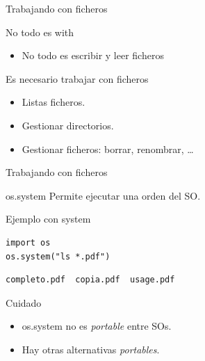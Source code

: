 \documentclass[bigger,unknownkeysallowed]{beamer}
\begin{document}
\begin{frame}[label={sec:org4c10693}]{Trabajando con ficheros}
\begin{block}{No todo es with}
\begin{itemize}
\item No todo es escribir y leer ficheros
\end{itemize}
\end{block}

\begin{block}{Es necesario trabajar con ficheros}
\begin{itemize}
\item Listas ficheros.

\item Gestionar directorios.

\item Gestionar ficheros: borrar, renombrar, \ldots{}
\end{itemize}
\end{block}
\end{frame}

\begin{frame}[fragile,label={sec:orga64b8b8}]{Trabajando con ficheros}
 \begin{block}{os.system}
Permite ejecutar una orden del SO.
\end{block}

\begin{exampleblock}{Ejemplo con system}
\begin{verbatim}
import os
os.system("ls *.pdf")
\end{verbatim}
\scriptsize
\begin{verbatim}
completo.pdf  copia.pdf  usage.pdf
\end{verbatim}
\end{exampleblock}

\begin{alertblock}{Cuidado}
\begin{itemize}
\item \alert{os.system} no es \emph{portable} entre SOs.

\item Hay otras alternativas \emph{portables}.
\end{itemize}
\end{alertblock}
\end{frame}
\end{document}
